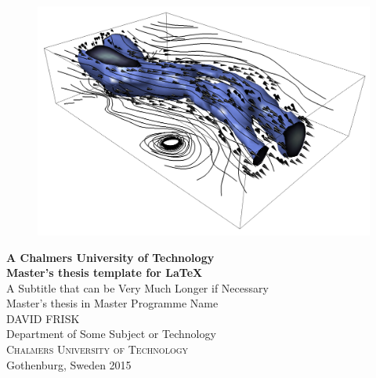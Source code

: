 
\begin{titlepage}
			
\addtolength{\voffset}{2cm}

\begin{figure}[h!]
\centering
\vspace{2cm}	%
\includegraphics[width=0.9\linewidth]{figure/Wind.png}
\end{figure}

\mbox{}
\vfill
\renewcommand{\familydefault}{\sfdefault} \normalfont %
\textbf{{\Huge 	A Chalmers University of Technology 	\\[0.2cm] 
				Master's thesis template for \LaTeX}} 	\\[0.5cm]
{\Large A Subtitle that can be Very Much Longer if Necessary}\\[0.5cm]
Master's thesis in Master Programme Name \\[0.5cm]

{\Large DAVID FRISK}\\[2.5cm]

Department of Some Subject or Technology \\
\textsc{Chalmers University of Technology} \\
Gothenburg, Sweden 2015

\renewcommand{\familydefault}{\rmdefault} \normalfont %
\end{titlepage}


